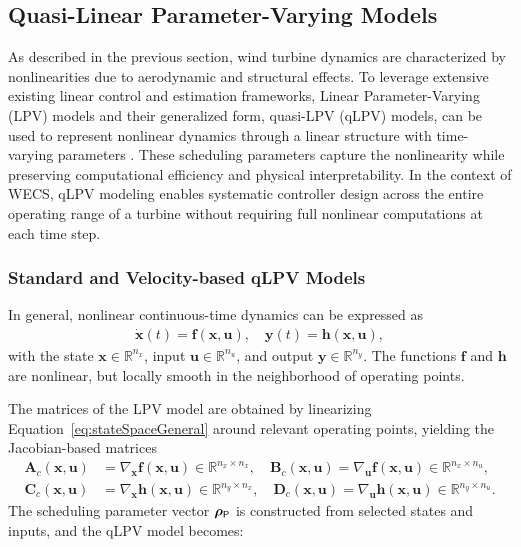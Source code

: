 \subsection{Quasi-Linear Parameter-Varying Models}
\label{sec:qLPVmodels}
As described in the previous section, wind turbine dynamics are characterized by nonlinearities due to aerodynamic and structural effects. To leverage extensive existing linear control and estimation frameworks, Linear Parameter-Varying (LPV) models and their generalized form, quasi-LPV (qLPV) models, can be used to represent nonlinear dynamics through a linear structure with time-varying parameters \cite{hoffmann2014survey}. These scheduling parameters capture the nonlinearity while preserving computational efficiency and physical interpretability. In the context of WECS, qLPV modeling enables systematic controller design across the entire operating range of a turbine without requiring full nonlinear computations at each time step.

\subsubsection{Standard and Velocity-based qLPV Models}
\label{sec:qLPVmodelTheory}

In general, nonlinear continuous-time dynamics can be expressed as
\begin{align} \label{eq:stateSpaceGeneral}
    \dot{\bm{x}}(t) = \bm{f}(\bm{x}, \bm{u}), \quad
    \bm{y}(t) = \bm{h}(\bm{x}, \bm{u}),
\end{align}
with the state $\bm{x} \in \mathbb{R}^{n_x}$, input $\bm{u} \in \mathbb{R}^{n_u }$, and output $\bm{y} \in \mathbb{R}^{n_y }$. The functions $\bm{f}$ and $\bm{h}$ are nonlinear, but locally smooth in the neighborhood of operating points.

The matrices of the LPV model are obtained by linearizing Equation~\eqref{eq:stateSpaceGeneral} around relevant operating points, yielding the Jacobian-based matrices
\begin{equation}\label{eq:contMatricesqLPV}
    \begin{aligned}
        \bm{A}_c(\bm{x},\bm{u}) &= \nabla_{\bm{x}} \bm{f}(\bm{x},\bm{u}) \in \mathbb{R}^{n_x \times n_x}, \quad
        \bm{B}_c(\bm{x},\bm{u}) = \nabla_{\bm{u}} \bm{f}(\bm{x},\bm{u}) \in \mathbb{R}^{n_x \times n_u}, \\
        \bm{C}_c(\bm{x},\bm{u}) &= \nabla_{\bm{x}} \bm{h}(\bm{x},\bm{u}) \in \mathbb{R}^{n_y \times n_x}, \quad
        \bm{D}_c(\bm{x},\bm{u}) = \nabla_{\bm{u}} \bm{h}(\bm{x},\bm{u})\in \mathbb{R}^{n_y \times n_u}.
    \end{aligned}
\end{equation}
The scheduling parameter vector $\bm{\rho}_{\mathsf{P}}$ is constructed from selected states and inputs, and the qLPV model becomes:


